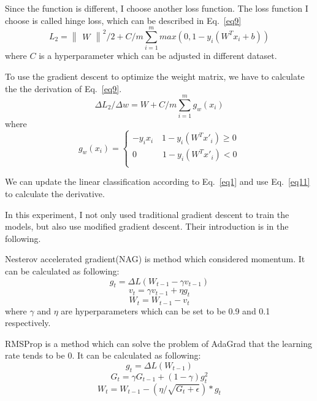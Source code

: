 \documentclass[journal, a4paper]{IEEEtran}
\begin{document}
Since the function is different, I choose another loss function. The loss function I choose is called hinge loss, which can be described in Eq.~\eqref{eq9}
\begin{equation}
L_2 = \begin{Vmatrix}W\end{Vmatrix}^2/2 + C/m \sum_{i=1}^m max(0, 1-y_i(W^Tx_i+b))
\label{eq9}
\end{equation}
where $C$ is a hyperparameter which can be adjusted in different dataset.

To use the gradient descent to optimize the weight matrix, we have to calculate the the derivation of Eq.~\eqref{eq9}.
\begin{equation}
\Delta L_2 / \Delta w = W + C/m\sum_{i=1}^m g_w(x_i)
\label{eq10}
\end{equation}
where
\begin{equation}
g_w(x_i)=\begin{cases}
-y_ix_i\quad 1-y_i(W^Tx'_i) \geq 0 \\
0\quad \quad \quad 1-y_i(W^Tx'_i) < 0 \\
\end{cases}
\label{eq11}
\end{equation}

We can update the linear classification according to Eq.~\eqref{eq1} and use Eq.~\eqref{eq11} to calculate the derivative.

In this experiment, I not only used traditional gradient descent to train the models, but also use modified gradient descent. Their introduction is in the following.

Nesterov accelerated gradient(NAG) is method which considered momentum. It can be calculated as following:
\begin{equation}
g_t=\Delta L(W_{t-1} - \gamma v_{t-1}) \label{eq12}
\end{equation}
\begin{equation}
v_t = \gamma v_{t-1} + \eta g_t \label{eq13}
\end{equation}
\begin{equation}
W_t = W_{t-1} - v_t \label{eq14}
\end{equation}
where $\gamma$ and $\eta$ are hyperparameters which can be set to be 0.9 and 0.1 respectively.

RMSProp is a method which can solve the problem of AdaGrad that the learning rate tends to be 0. It can be calculated as following:
\begin{equation}
g_t=\Delta L(W_{t-1}) \label{eq15}
\end{equation}
\begin{equation}
G_t = \gamma G_{t-1} + (1-\gamma)g_t^2 \label{eq16}
\end{equation}
\begin{equation}
W_t = W_{t-1} - (\eta / \sqrt{G_t+\epsilon}) * g_t \label{eq17}
\end{equation}
\end{document}
